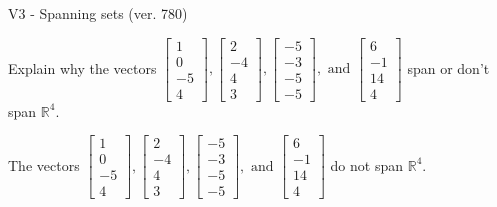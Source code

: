 \begin{exercise}
  \begin{exerciseTitle}V3 - Spanning sets (ver. 780)\end{exerciseTitle}
  \begin{exerciseStatement}
    Explain why the vectors \(\left[\begin{array}{r}
1 \\
0 \\
-5 \\
4
\end{array}\right] , \left[\begin{array}{r}
2 \\
-4 \\
4 \\
3
\end{array}\right] , \left[\begin{array}{r}
-5 \\
-3 \\
-5 \\
-5
\end{array}\right] , \text{ and } \left[\begin{array}{r}
6 \\
-1 \\
14 \\
4
\end{array}\right]\) span or don't span \(\mathbb{R}^4\). 
	


  \end{exerciseStatement}
  \begin{exerciseAnswer}
   The vectors \(\left[\begin{array}{r}
1 \\
0 \\
-5 \\
4
\end{array}\right] , \left[\begin{array}{r}
2 \\
-4 \\
4 \\
3
\end{array}\right] , \left[\begin{array}{r}
-5 \\
-3 \\
-5 \\
-5
\end{array}\right] , \text{ and } \left[\begin{array}{r}
6 \\
-1 \\
14 \\
4
\end{array}\right]\) 
  	 do not  
	span \(\mathbb{R}^4\).
  


  \end{exerciseAnswer}
\end{exercise}